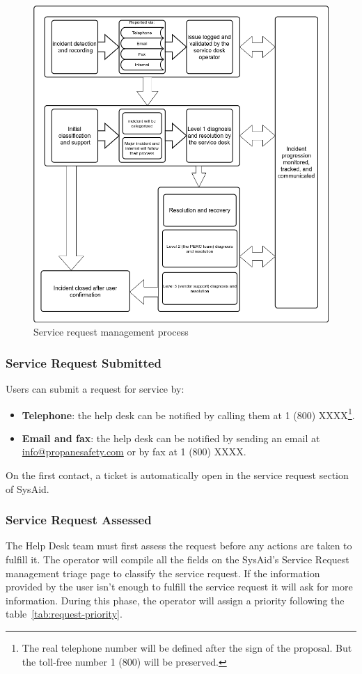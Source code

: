 \begin{figure}[h!]
	\centering
	\includegraphics[width=120mm]{./img/procedures/incident-workflow.png}
	\caption{Service request management process}\label{fig:request-wrokflow}
\end{figure}

\subsubsection{Service Request Submitted}
Users can submit a request for service by:
\begin{itemize}
	\item \textbf{Telephone}: the help desk can be notified by calling them at 1 (800) XXXX\footnote{The real telephone number will be defined after the sign of the proposal. But the toll-free number 1 (800) will be preserved.\label{fnlabel}}.
	
	\item \textbf{Email and fax}: the help desk can be notified by sending an email at \href{mailto:info@propanesafety.com}{info@propanesafety.com} or by fax at 1 (800) XXXX.
\end{itemize}
On the first contact, a ticket is automatically open in the service request section of SysAid.

\subsubsection{Service Request Assessed}
The Help Desk team must first assess the request before any actions are taken to fulfill it. The operator will compile all the fields on the SysAid’s Service Request management triage page to classify the service request. If the information provided by the user isn't enough to fulfill the service request it will ask for more information. During this phase, the operator will assign a priority following the table~\ref{tab:request-priority}.

